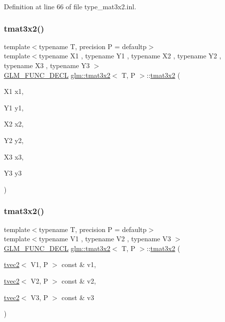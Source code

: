 Definition at line 66 of file type\+\_\+mat3x2.\+inl.

\mbox{\label{structglm_1_1tmat3x2_a11808723576eb33086d64fb1e1ad6105}} 
\subsubsection{\texorpdfstring{tmat3x2()}{tmat3x2()}\hspace{0.1cm}{\footnotesize\ttfamily [8/22]}}
{\footnotesize\ttfamily template$<$typename T, precision P = defaultp$>$ \\
template$<$typename X1 , typename Y1 , typename X2 , typename Y2 , typename X3 , typename Y3 $>$ \\
\mbox{\hyperlink{setup_8hpp_ab2d052de21a70539923e9bcbf6e83a51}{G\+L\+M\+\_\+\+F\+U\+N\+C\+\_\+\+D\+E\+CL}} \mbox{\hyperlink{structglm_1_1tmat3x2}{glm\+::tmat3x2}}$<$ T, P $>$\+::\mbox{\hyperlink{structglm_1_1tmat3x2}{tmat3x2}} (\begin{DoxyParamCaption}\item[{X1}]{x1,  }\item[{Y1}]{y1,  }\item[{X2}]{x2,  }\item[{Y2}]{y2,  }\item[{X3}]{x3,  }\item[{Y3}]{y3 }\end{DoxyParamCaption})}

\mbox{\label{structglm_1_1tmat3x2_a12d9e62a09e2d082664841f719999405}} 
\subsubsection{\texorpdfstring{tmat3x2()}{tmat3x2()}\hspace{0.1cm}{\footnotesize\ttfamily [9/22]}}
{\footnotesize\ttfamily template$<$typename T, precision P = defaultp$>$ \\
template$<$typename V1 , typename V2 , typename V3 $>$ \\
\mbox{\hyperlink{setup_8hpp_ab2d052de21a70539923e9bcbf6e83a51}{G\+L\+M\+\_\+\+F\+U\+N\+C\+\_\+\+D\+E\+CL}} \mbox{\hyperlink{structglm_1_1tmat3x2}{glm\+::tmat3x2}}$<$ T, P $>$\+::\mbox{\hyperlink{structglm_1_1tmat3x2}{tmat3x2}} (\begin{DoxyParamCaption}\item[{\mbox{\hyperlink{structglm_1_1tvec2}{tvec2}}$<$ V1, P $>$ const \&}]{v1,  }\item[{\mbox{\hyperlink{structglm_1_1tvec2}{tvec2}}$<$ V2, P $>$ const \&}]{v2,  }\item[{\mbox{\hyperlink{structglm_1_1tvec2}{tvec2}}$<$ V3, P $>$ const \&}]{v3 }\end{DoxyParamCaption})}

